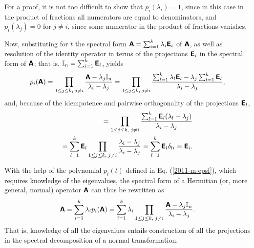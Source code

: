 {\color{OliveGreen}\bproof

For a proof, it is not too difficult
to show that
$p_i  (\lambda_i)=1$, since in this case in the product of fractions all numerators are equal to denominators,
and
$p_i  (\lambda_j)=0$ for $j\neq i $, since some numerator in the product of fractions vanishes.

Now, substituting for $t$ the spectral form $\textsf{\textbf{A}}=\sum_{i=1}^k \lambda_i\textsf{\textbf{E}}_i$
of $\textsf{\textbf{A}}$, as well as
resolution of the identity operator in terms of the projections $\textsf{\textbf{E}}_i$ in the spectral form of
$\textsf{\textbf{A}}$; that is, ${\Bbb I}_n=\sum_{i=1}^k \textsf{\textbf{E}}_i$,
yields
\begin{equation}
p_i  (\textsf{\textbf{A}})
=
\prod_{
1\le j\le k,\;
j\neq i
}\frac{\textsf{\textbf{A}} - \lambda_j{\Bbb I}_n}{\lambda_i -\lambda_j}
=
\prod_{
1\le j\le k,\;
j\neq i
}\frac{\sum_{l=1}^k \lambda_l\textsf{\textbf{E}}_l - \lambda_j\sum_{l=1}^k \textsf{\textbf{E}}_l}{\lambda_i -\lambda_j},
\end{equation}
and, because of the idempotence and pairwise orthogonality of the projections  $\textsf{\textbf{E}}_l$,
\begin{equation}
\begin{split}
=
\prod_{
1\le j\le k,\;
j\neq i
}\frac{\sum_{l=1}^k \textsf{\textbf{E}}_l(\lambda_l- \lambda_j)}{\lambda_i -\lambda_j}  \\
= \sum_{l=1}^k \textsf{\textbf{E}}_l
\prod_{
1\le j\le k,\;
j\neq i
}\frac{\lambda_l- \lambda_j}{\lambda_i -\lambda_j}
= \sum_{l=1}^k \textsf{\textbf{E}}_l
\delta_{li} = \textsf{\textbf{E}}_i.
\label{2012-m-ch-fdvs-cc}
\end{split}
\end{equation}
\eproof
}

With the help of the polynomial $p_i(t)$ defined in Eq. (\ref{2011-m-epsf}),
which requires knowledge of the eigenvalues,
the spectral form of a Hermitian (or, more general, normal) operator  $\textsf{\textbf{A}}$ can thus be rewritten as
\begin{equation}
\textsf{\textbf{A}}=\sum_{i=1}^k \lambda_i p_i(\textsf{\textbf{A}})=  \sum_{i=1}^k \lambda_i \prod_{
1\le j\le k,\;
j\neq i
}\frac{\textsf{\textbf{A}} - \lambda_j{\Bbb I}_n}{\lambda_i -\lambda_j}.
\end{equation}
That is, knowledge of all the eigenvalues entails construction
of all the projections in the spectral decomposition
of a normal transformation.


